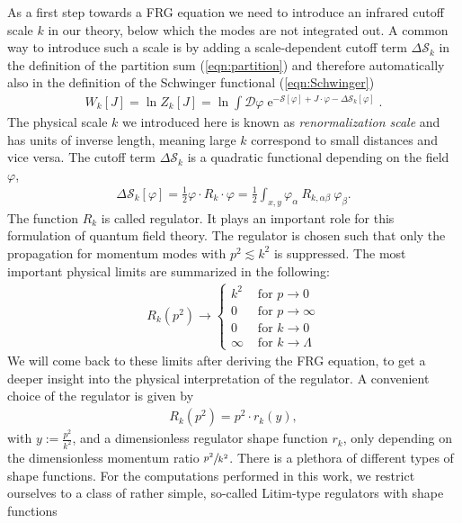 As a first step towards a FRG equation we need to introduce an infrared cutoff scale $k$ in our theory, below which the modes are not integrated out. A common way to introduce such a scale is by  adding a scale-dependent cutoff term $\Delta\mathcal{S}_k$ in the definition of the partition sum (\ref{eqn:partition}) and therefore automatically also in the definition of the Schwinger functional (\ref{eqn:Schwinger})
\begin{align}
W_{k}[J]=\ln Z_{k}[J]=\ln \int \mathcal{D} \varphi  \operatorname{e}^{-\mathcal{S}[\varphi]+J \cdot \varphi-\Delta \mathcal{S}_{k}[\varphi]}.
\label{eqn:Wk}
\end{align}
The physical scale $k$ we introduced here is known as \textit{renormalization scale} and has units of inverse length, meaning large $k$ correspond to small distances and vice versa. The cutoff term $\Delta\mathcal{S}_k$ is a quadratic functional depending on the field $\varphi$,
\begin{align}
	\Delta \mathcal{S}_{k}[\varphi]=\frac{1}{2} \varphi \cdot R_{k} \cdot \varphi=\frac{1}{2} \int_{x, y} \varphi_{\alpha} \ R_{k, \alpha\beta} \ \varphi_{\beta}.
\end{align}
The function $R_k$ is called regulator. It plays an important role for this formulation of quantum field theory. The regulator is chosen such that only the propagation for momentum modes with $p^2 \lesssim k^2$ is suppressed. The most important physical limits are summarized in the following:
\begin{align}
	R_{k}(p^2) \rightarrow\left\{\begin{array}{ll}{k^{2}} & {\text { for } p \rightarrow 0} \\ {0} & {\text { for } p \rightarrow \infty} \\ {0} & {\text { for } k \rightarrow 0} \\ {\infty} & {\text { for } k \rightarrow \Lambda}\end{array}\right.
\end{align}
We will come back to these limits after deriving the FRG equation, to get a deeper insight into the physical interpretation of the regulator.
A convenient choice of the regulator is given by
\begin{align}
	R_k(p^2) = p^2 \cdot r_k(y),
\end{align}
with $ y := \frac{p^2}{k^2}$, and a dimensionless regulator shape function $r_k$, only depending on the dimensionless momentum ratio $\sfrac{p^2}{k^2}$. There is a plethora of different types of shape functions. For the computations performed in this work, we restrict ourselves to a class of rather simple, so-called Litim-type regulators with shape functions
